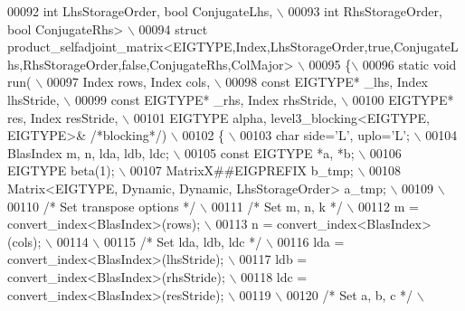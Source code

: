 \begin{DoxyCode}
00092 \textcolor{preprocessor}{          int LhsStorageOrder, bool ConjugateLhs, \(\backslash\)}
00093 \textcolor{preprocessor}{          int RhsStorageOrder, bool ConjugateRhs> \(\backslash\)}
00094 \textcolor{preprocessor}{struct
       product\_selfadjoint\_matrix<EIGTYPE,Index,LhsStorageOrder,true,ConjugateLhs,RhsStorageOrder,false,ConjugateRhs,ColMajor> \(\backslash\)}
00095 \textcolor{preprocessor}{\{\(\backslash\)}
00096 \textcolor{preprocessor}{  static void run( \(\backslash\)}
00097 \textcolor{preprocessor}{    Index rows, Index cols, \(\backslash\)}
00098 \textcolor{preprocessor}{    const EIGTYPE* \_lhs, Index lhsStride, \(\backslash\)}
00099 \textcolor{preprocessor}{    const EIGTYPE* \_rhs, Index rhsStride, \(\backslash\)}
00100 \textcolor{preprocessor}{    EIGTYPE* res,        Index resStride, \(\backslash\)}
00101 \textcolor{preprocessor}{    EIGTYPE alpha, level3\_blocking<EIGTYPE, EIGTYPE>& }\textcolor{comment}{/*blocking*/}\textcolor{preprocessor}{) \(\backslash\)}
00102 \textcolor{preprocessor}{  \{ \(\backslash\)}
00103 \textcolor{preprocessor}{    char side='L', uplo='L'; \(\backslash\)}
00104 \textcolor{preprocessor}{    BlasIndex m, n, lda, ldb, ldc; \(\backslash\)}
00105 \textcolor{preprocessor}{    const EIGTYPE *a, *b; \(\backslash\)}
00106 \textcolor{preprocessor}{    EIGTYPE beta(1); \(\backslash\)}
00107 \textcolor{preprocessor}{    MatrixX##EIGPREFIX b\_tmp; \(\backslash\)}
00108 \textcolor{preprocessor}{    Matrix<EIGTYPE, Dynamic, Dynamic, LhsStorageOrder> a\_tmp; \(\backslash\)}
00109 \textcolor{preprocessor}{\(\backslash\)}
00110 \textcolor{preprocessor}{}\textcolor{comment}{/* Set transpose options */}\textcolor{preprocessor}{ \(\backslash\)}
00111 \textcolor{preprocessor}{}\textcolor{comment}{/* Set m, n, k */}\textcolor{preprocessor}{ \(\backslash\)}
00112 \textcolor{preprocessor}{    m = convert\_index<BlasIndex>(rows); \(\backslash\)}
00113 \textcolor{preprocessor}{    n = convert\_index<BlasIndex>(cols); \(\backslash\)}
00114 \textcolor{preprocessor}{\(\backslash\)}
00115 \textcolor{preprocessor}{}\textcolor{comment}{/* Set lda, ldb, ldc */}\textcolor{preprocessor}{ \(\backslash\)}
00116 \textcolor{preprocessor}{    lda = convert\_index<BlasIndex>(lhsStride); \(\backslash\)}
00117 \textcolor{preprocessor}{    ldb = convert\_index<BlasIndex>(rhsStride); \(\backslash\)}
00118 \textcolor{preprocessor}{    ldc = convert\_index<BlasIndex>(resStride); \(\backslash\)}
00119 \textcolor{preprocessor}{\(\backslash\)}
00120 \textcolor{preprocessor}{}\textcolor{comment}{/* Set a, b, c */}\textcolor{preprocessor}{ \(\backslash\)}

\end{DoxyCode}
